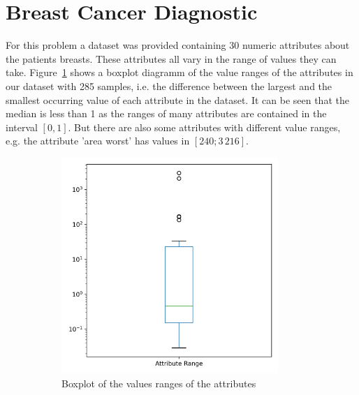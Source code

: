 \documentclass[a4paper,11pt]{article}
\begin{document}
\section{Breast Cancer Diagnostic}
    For this problem a dataset was provided containing $30$ numeric attributes about the patients breasts. These attributes all vary in the range of values they can take. Figure~\ref{fig:breast-cancer_value_ranges} shows a boxplot diagramm of the value ranges of the attributes in our dataset with 285 samples, i.e. the difference between the largest and the smallest occurring value of each attribute in the dataset. It can be seen that the median is less than 1 as the ranges of many attributes are contained in the interval $[0,1]$. But there are also some attributes with different value ranges, e.g. the attribute 'area worst' has values in $[240;3\,216]$. 
    \begin{figure}[h!]
        \centering
        \begin{subfigure}[c]{0.45\textwidth}
            \centering
            \includegraphics[width=0.9\textwidth]{exercise_1/paper/figures/breast_cancer_range_plot.png}
            \caption{Boxplot of the values ranges of the attributes}
            \label{fig:breast-cancer_value_ranges}
        \end{subfigure}
        \begin{subfigure}[c]{0.45\textwidth}
            \centering

\end{subfigure}
\end{figure}
\end{document}
